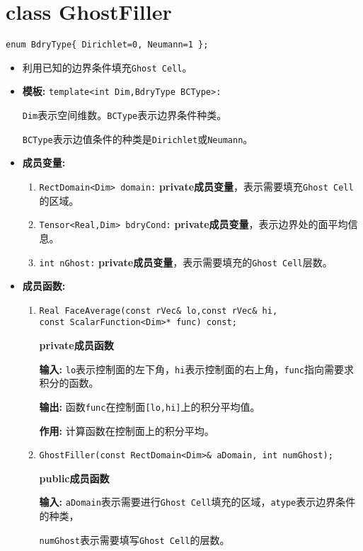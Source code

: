 \documentclass[UTF8]{ctexart}
\theoremstyle{plain}
\theoremstyle{definition}
\theoremstyle{remark}
\begin{document}
\section{class GhostFiller}
\texttt{enum BdryType\{ Dirichlet=0, Neumann=1 \};}
\begin{itemize}
    \item 利用已知的边界条件填充\texttt{Ghost Cell}。
    \item \textbf{模板:} \texttt{template<int Dim,BdryType BCType>:}
    
    \texttt{Dim}表示空间维数。\texttt{BCType}表示边界条件种类。

    \texttt{BCType}表示边值条件的种类是\texttt{Dirichlet}或\texttt{Neumann}。
    \item \textbf{成员变量:}
    \begin{enumerate}
        \item \texttt{RectDomain<Dim> domain:} \textbf{private成员变量}，表示需要填充\texttt{Ghost Cell}的区域。
        \item \texttt{Tensor<Real,Dim> bdryCond:} \textbf{private成员变量}，表示边界处的面平均信息。
        \item \texttt{int nGhost:} \textbf{private成员变量}，表示需要填充的\texttt{Ghost Cell}层数。
    \end{enumerate}
    \item \textbf{成员函数:}
    \begin{enumerate}
        \item \texttt{Real FaceAverage(const rVec\& lo,const rVec\& hi,\\const ScalarFunction<Dim>* func) const;}
        
        \textbf{private成员函数}

        \textbf{输入:} \texttt{lo}表示控制面的左下角，\texttt{hi}表示控制面的右上角，\texttt{func}指向需要求积分的函数。

        \textbf{输出:} 函数\texttt{func}在控制面\texttt{[lo,hi]}上的积分平均值。

        \textbf{作用:} 计算函数在控制面上的积分平均。

        \item \texttt{GhostFiller(const RectDomain<Dim>\& aDomain, int numGhost);}
        
        \textbf{public成员函数}

        \textbf{输入:} \texttt{aDomain}表示需要进行\texttt{Ghost Cell}填充的区域，\texttt{atype}表示边界条件的种类， 
        
        \texttt{numGhost}表示需要填写\texttt{Ghost Cell}的层数。


\end{enumerate}
\end{itemize}
\end{document}
